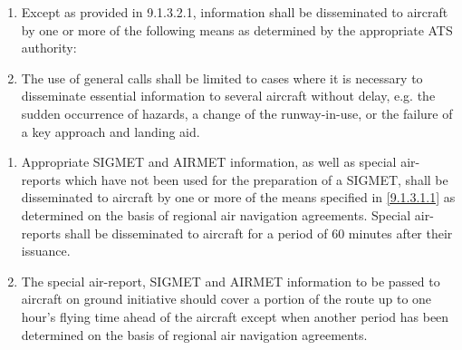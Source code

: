 \begin{enumeratesc}
    \begin{enumerate}
        \item \label{9.1.3.1.1} Except as provided in 9.1.3.2.1, information shall be disseminated to aircraft by one or more of the following means as determined by the appropriate ATS authority:

        \item The use of general calls shall be limited to cases where it is necessary to disseminate essential information to several aircraft without delay, e.g. the sudden occurrence of hazards, a change of the runway-in-use, or the failure of a key approach and landing aid.
    \end{enumerate}

    \begin{enumerate}
        \item Appropriate SIGMET and AIRMET information, as well as special air-reports which have not been used for the preparation of a SIGMET, shall be disseminated to aircraft by one or more of the means specified in \ref{9.1.3.1.1} as determined on the basis of regional air navigation agreements. Special air-reports shall be disseminated to aircraft for a period of 60 minutes after their issuance.
        \item The special air-report, SIGMET and AIRMET information to be passed to aircraft on ground initiative should cover a portion of the route up to one hour’s flying time ahead of the aircraft except when another period has been determined on the basis of regional air navigation agreements.
    \end{enumerate}


\end{enumeratesc}
